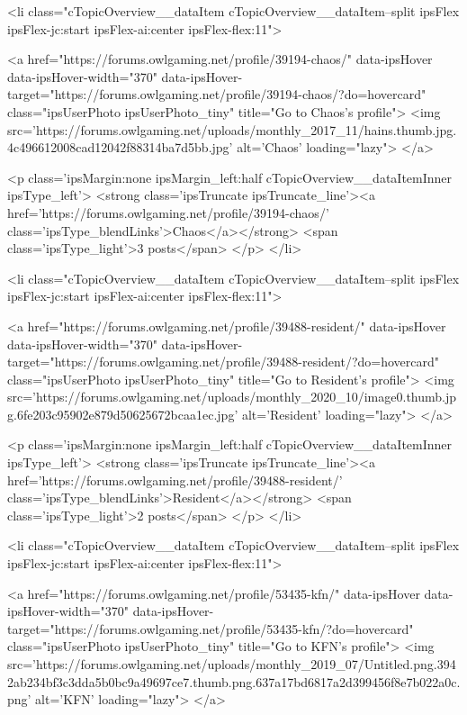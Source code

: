 						<li class="cTopicOverview__dataItem cTopicOverview__dataItem--split ipsFlex ipsFlex-jc:start ipsFlex-ai:center ipsFlex-flex:11">
							


	<a href="https://forums.owlgaming.net/profile/39194-chaos/" data-ipsHover data-ipsHover-width="370" data-ipsHover-target="https://forums.owlgaming.net/profile/39194-chaos/?do=hovercard" class="ipsUserPhoto ipsUserPhoto_tiny" title="Go to Chaos's profile">
		<img src='https://forums.owlgaming.net/uploads/monthly_2017_11/hains.thumb.jpg.4c496612008cad12042f88314ba7d5bb.jpg' alt='Chaos' loading="lazy">
	</a>

							<p class='ipsMargin:none ipsMargin_left:half cTopicOverview__dataItemInner ipsType_left'>
								<strong class='ipsTruncate ipsTruncate_line'><a href='https://forums.owlgaming.net/profile/39194-chaos/' class='ipsType_blendLinks'>Chaos</a></strong>
								<span class='ipsType_light'>3 posts</span>
							</p>
						</li>
					
						<li class="cTopicOverview__dataItem cTopicOverview__dataItem--split ipsFlex ipsFlex-jc:start ipsFlex-ai:center ipsFlex-flex:11">
							


	<a href="https://forums.owlgaming.net/profile/39488-resident/" data-ipsHover data-ipsHover-width="370" data-ipsHover-target="https://forums.owlgaming.net/profile/39488-resident/?do=hovercard" class="ipsUserPhoto ipsUserPhoto_tiny" title="Go to Resident's profile">
		<img src='https://forums.owlgaming.net/uploads/monthly_2020_10/image0.thumb.jpg.6fe203c95902e879d50625672bcaa1ec.jpg' alt='Resident' loading="lazy">
	</a>

							<p class='ipsMargin:none ipsMargin_left:half cTopicOverview__dataItemInner ipsType_left'>
								<strong class='ipsTruncate ipsTruncate_line'><a href='https://forums.owlgaming.net/profile/39488-resident/' class='ipsType_blendLinks'>Resident</a></strong>
								<span class='ipsType_light'>2 posts</span>
							</p>
						</li>
					
						<li class="cTopicOverview__dataItem cTopicOverview__dataItem--split ipsFlex ipsFlex-jc:start ipsFlex-ai:center ipsFlex-flex:11">
							


	<a href="https://forums.owlgaming.net/profile/53435-kfn/" data-ipsHover data-ipsHover-width="370" data-ipsHover-target="https://forums.owlgaming.net/profile/53435-kfn/?do=hovercard" class="ipsUserPhoto ipsUserPhoto_tiny" title="Go to KFN's profile">
		<img src='https://forums.owlgaming.net/uploads/monthly_2019_07/Untitled.png.3942ab234bf3c3dda5b0bc9a49697ce7.thumb.png.637a17bd6817a2d399456f8e7b022a0c.png' alt='KFN' loading="lazy">
	</a>

